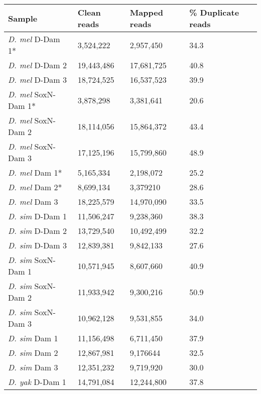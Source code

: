 \begin{table}[!h]
\centering
\begin{tabular}{|l|l|l|l|}
\hline
\textbf{Sample}             & \textbf{Clean reads} & \textbf{Mapped reads} & \textbf{\% Duplicate reads} \\ \hline
\emph{D. mel} D-Dam 1*    & 3,524,222   & 2,957,450    & 34.3               \\ \hline 
\emph{D. mel} D-Dam 2     & 19,443,486  & 17,681,725   & 40.8               \\ \hline
\emph{D. mel} D-Dam 3     & 18,724,525  & 16,537,523   & 39.9               \\ \hline
\emph{D. mel} SoxN-Dam 1* & 3,878,298   & 3,381,641    & 20.6               \\ \hline
\emph{D. mel} SoxN-Dam 2  & 18,114,056  & 15,864,372   & 43.4               \\ \hline
\emph{D. mel} SoxN-Dam 3  & 17,125,196  & 15,799,860   & 48.9               \\ \hline
\emph{D. mel} Dam 1*      & 5,165,334   & 2,198,072    & 25.2               \\ \hline
\emph{D. mel} Dam 2*      & 8,699,134   & 3,379210     & 28.6               \\ \hline
\emph{D. mel} Dam 3       & 18,225,579  & 14,970,090   & 33.5               \\ \hline
\emph{D. sim} D-Dam 1     & 11,506,247  & 9,238,360    & 38.3               \\ \hline
\emph{D. sim} D-Dam 2     & 13,729,540  & 10,492,499   & 32.2               \\ \hline
\emph{D. sim} D-Dam 3     & 12,839,381  & 9,842,133    & 27.6               \\ \hline
\emph{D. sim} SoxN-Dam 1  & 10,571,945  & 8,607,660    & 40.9               \\ \hline
\emph{D. sim} SoxN-Dam 2  & 11,933,942  & 9,300,216    & 50.9               \\ \hline
\emph{D. sim} SoxN-Dam 3  & 10,962,128  & 9,531,855    & 34.0                 \\ \hline
\emph{D. sim} Dam 1       & 11,156,498  & 6,711,450    & 37.9               \\ \hline
\emph{D. sim} Dam 2       & 12,867,981  & 9,176644     & 32.5               \\ \hline
\emph{D. sim} Dam 3       & 12,351,232  & 9,719,920    & 30.0                 \\ \hline
\emph{D. yak} D-Dam 1     & 14,791,084  & 12,244,800   & 37.8               \\ \hline

\end{tabular}
\end{table}
